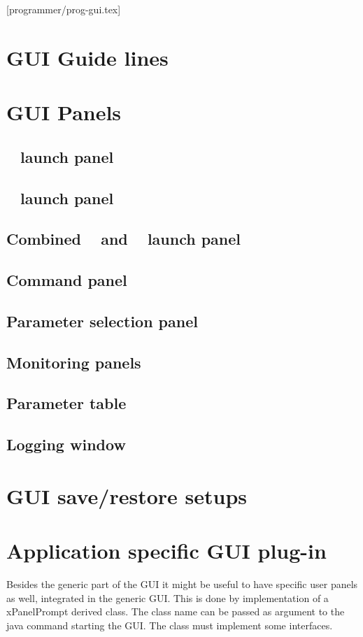 [programmer/prog-gui.tex]
\section{GUI Guide lines}
\section{GUI Panels}
\subsection{\dabc~ launch panel}
\subsection{\mbs~ launch panel}
\subsection{Combined \dabc~ and \mbs~ launch panel}
\subsection{Command panel}
\subsection{Parameter selection panel}
\subsection{Monitoring panels}
\subsection{Parameter table}
\subsection{Logging window}
\section{GUI save/restore setups}
\section{Application specific GUI plug-in}
Besides the generic part of the GUI it might be useful to have specific user panels as well, integrated in the generic GUI. This is done by implementation of a xPanelPrompt derived class. The class name can be 
passed as argument to the java command starting the GUI. The class must implement some interfaces.
